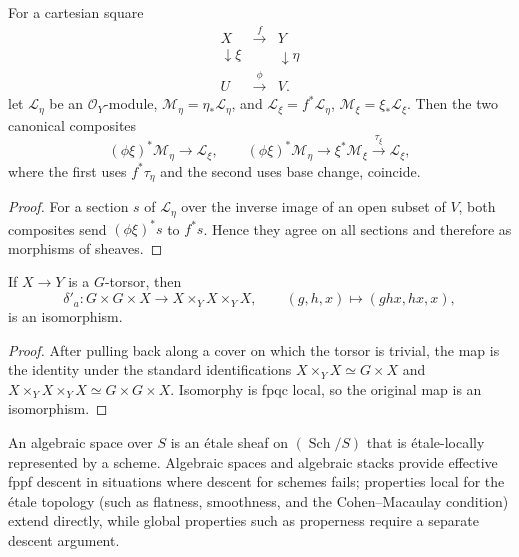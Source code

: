 \begin{proposition}\label{fga-pro-4-41}
For a cartesian square
\[
\begin{array}{ccc}
X&\xrightarrow{f}&Y\\[-1mm]
\downarrow\!\xi&&\downarrow\!\eta\\[-1mm]
U&\xrightarrow{\phi}&V .
\end{array}
\]
let $\mathcal L_\eta$ be an $\mathcal O_Y$-module,
$\mathcal M_\eta=\eta_*\mathcal L_\eta$, and
$\mathcal L_\xi=f^*\mathcal L_\eta$, $\mathcal M_\xi=\xi_*\mathcal L_\xi$.
Then the two canonical composites
\[
(\phi\xi)^*\mathcal M_\eta\longrightarrow\mathcal L_\xi,
\qquad
(\phi\xi)^*\mathcal M_\eta\longrightarrow\xi^*\mathcal M_\xi
 \xrightarrow{\tau_\xi}\mathcal L_\xi,
\]
where the first uses $f^*\tau_\eta$ and the second uses base change, coincide.
\end{proposition}
\begin{proof}
For a section $s$ of $\mathcal L_\eta$ over the inverse image of an open subset
of $V$, both composites send $(\phi\xi)^*s$ to $f^*s$.  Hence they agree on all
sections and therefore as morphisms of sheaves.
\end{proof}

\begin{lemma}\label{fga-lem-4-47}
If $X\to Y$ is a $G$-torsor, then
\[
\delta'_a:G\times G\times X\longrightarrow X\times_YX\times_YX,
\qquad(g,h,x)\longmapsto(ghx,hx,x),
\]
is an isomorphism.
\end{lemma}
\begin{proof}
After pulling back along a cover on which the torsor is trivial, the map is the
identity under the standard identifications
$X\times_YX\simeq G\times X$ and
$X\times_YX\times_YX\simeq G\times G\times X$.  Isomorphy is fpqc local, so
the original map is an isomorphism.
\end{proof}

\begin{remark}\label{fga-rem-4-48}
An algebraic space over $S$ is an étale sheaf on $(\operatorname{Sch}/S)$ that
is étale-locally represented by a scheme.  Algebraic spaces and algebraic stacks
provide effective fppf descent in situations where descent for schemes fails;
properties local for the étale topology (such as flatness, smoothness, and the
Cohen--Macaulay condition) extend directly, while global properties such as
properness require a separate descent argument.
\end{remark}
